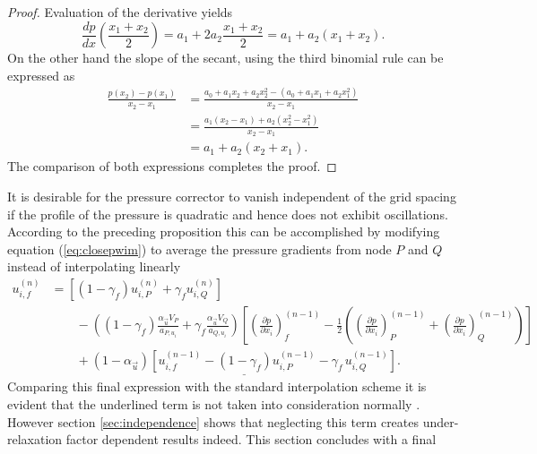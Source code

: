 \begin{proof}
  Evaluation of the derivative yields
  \begin{displaymath}
      \frac{dp}{dx}\left(\frac{x_1+x_2}{2}\right) = a_1 + 2 a_2 \frac{x_1 + x_2}{2} = a_1 + a_2(x_1 + x_2).
  \end{displaymath}
  On the other hand the slope of the secant, using the third binomial rule can be expressed as
  \begin{displaymath}
    \begin{array}{ll}
    \frac{p(x_2) - p(x_1)}{x_2 - x_1} 
  &= \frac{a_0 + a_1 x_2 + a_2 x_2^2 - \left(a_0 + a_1 x_1 + a_2 x_1 ^2\right)}{x_2 - x_1} \\[1.0em]
    \quad &= \frac{a_1 (x_2 - x_1) + a_2 \left(x_2^2 - x_1^2\right)}{x_2 - x_1} \\[1.0em]
    \quad &= a_1 + a_2 (x_2 + x_1).
  \end{array}
  \end{displaymath}
  The comparison of both expressions completes the proof.
\end{proof}
  It is desirable for the pressure corrector to vanish independent of the grid spacing if the profile of the pressure is quadratic and hence does not exhibit oscillations. According to the preceding proposition this can be accomplished by modifying equation (\ref{eq:closepwim}) to average the pressure gradients from node \(P\) and \(Q\) instead of interpolating linearly
  \begin{align}
    u_{i,f}^{(n)} 
    &=
    \left[\left(1 - \gamma_f\right) u_{i,P}^{(n)} + \gamma_f u_{i,Q}^{(n)} \right] \nonumber\\[1em]
    &\quad\quad - 
    \left(\left(1 - \gamma_f\right) \frac{\alpha_\vec{u} V_P}{a_{P,u_i}} + \gamma_f \frac{\alpha_\vec{u} V_Q}{a_{Q,u_i}}\right)
    \left[ 
    \left(\frac{\partial p}{\partial x_i}\right)_f^{(n-1)} 
    - \frac{1}{2} \left( \left( \frac{\partial p}{\partial x_i} \right)_P^{(n-1)} 
    + \left(\frac{\partial p}{\partial x_i}\right)_Q^{(n-1)} \right)
    \right] \nonumber \\[1em]
    \label{eq:pwim}
    &\quad\quad + \underline{\left(1 - \alpha_\vec{u}\right) \left[ u_{i,f}^{(n-1)} - \left(1 - \gamma_f\right) u_{i,P}^{(n-1)} - \gamma_f \, u_{i,Q}^{(n-1)} \right]}.
  \end{align}
  Comparing this final expression with the standard interpolation scheme it is evident that the underlined term is not taken into consideration normally \cite{ferziger02}. However section \ref{sec:independence} shows that neglecting this term creates under-relaxation factor dependent results indeed. This section concludes with a final
